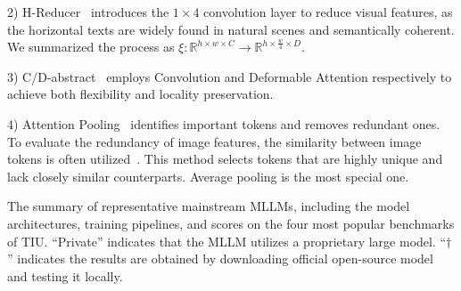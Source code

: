 
2) H-Reducer~\cite{Hu2024ARXIV_mPLUG_DocOwl_1} introduces the $1 \times 4$ convolution layer to reduce visual features, as the horizontal texts are widely found in natural scenes and semantically coherent.
We summarized the process as $\xi: \mathbb{R}^{h \times w \times C} \xrightarrow{} \mathbb{R}^{h \times \frac{w}{4} \times D}$.

3) C/D-abstract~\cite{cha2024honeybee} employs Convolution and Deformable Attention respectively to achieve both flexibility and locality preservation.

4) Attention Pooling~\cite{Liu2024ARXIV_TextMonkey_An_OCR,Huang2024ARXIV_Mini_Monkey_Alleviating} identifies important tokens and removes redundant ones. To evaluate the redundancy of image features, the similarity between image tokens is often utilized~\cite{Liu2024ARXIV_TextMonkey_An_OCR}. This method selects tokens that are highly unique and lack closely similar counterparts. Average pooling is the most special one.
\begin{table*}[!t]
    \centering
    \scalebox{0.78}{
    
    }
    \vspace{-0.5em}
    \caption{The summary of representative mainstream MLLMs, including the model architectures, training pipelines, and scores on the four most popular benchmarks of TIU. ``Private'' indicates that the MLLM utilizes a proprietary large model. ``$\dagger$'' indicates the results are obtained by downloading official open-source model and testing it locally.}
    \label{tab:mllm_summary}
    \vspace{-1.5em}
\end{table*}

